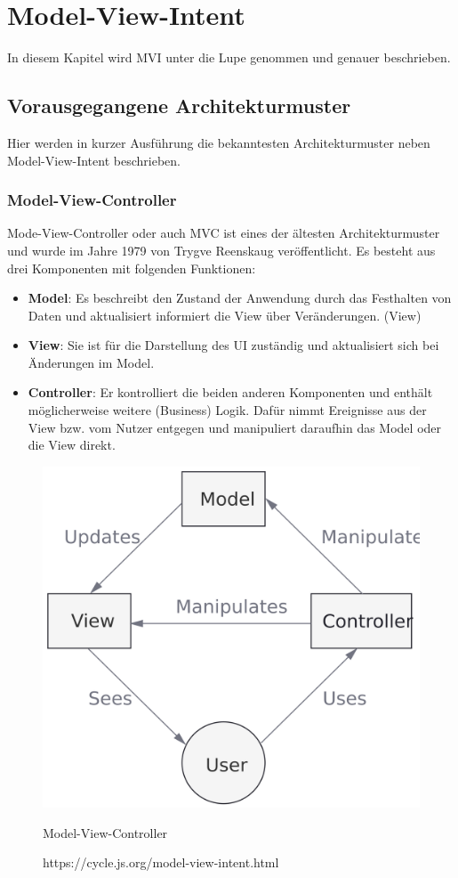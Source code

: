 \section{Model-View-Intent}
\label{sec:model-view-intent}
In diesem Kapitel wird MVI unter die Lupe genommen und genauer beschrieben.

\subsection{Vorausgegangene Architekturmuster}
Hier werden in kurzer Ausführung die bekanntesten Architekturmuster neben Model-View-Intent beschrieben.

\subsubsection{Model-View-Controller}
Mode-View-Controller oder auch MVC ist eines der ältesten Architekturmuster und wurde im Jahre 1979 von Trygve Reenskaug veröffentlicht.
\cite{theModelViewEditorTrygveReenskaug1979, modelsViewsControllersTrygveReenskaug1979}
Es besteht aus drei Komponenten mit folgenden Funktionen:
\begin{itemize}
	\item \textbf{Model}: Es beschreibt den Zustand der Anwendung durch das Festhalten von Daten und aktualisiert informiert die View über Veränderungen. (View)
	\item \textbf{View}: Sie ist für die Darstellung des UI zuständig und aktualisiert sich bei Änderungen im Model.
	\item \textbf{Controller}:  Er kontrolliert die beiden anderen Komponenten und enthält möglicherweise weitere (Business) Logik. Dafür nimmt Ereignisse aus der View bzw. vom Nutzer entgegen und manipuliert daraufhin das Model oder die View direkt. 
\end{itemize}
\begin{figure}[ht]
	\centering
	\includegraphics[height=0.5\textwidth]{./images/mvc-diagram.png}
	\caption{Model-View-Controller}
	\caption*{https://cycle.js.org/model-view-intent.html}
	\label{fig:mvc}
\end{figure}
\clearpage

